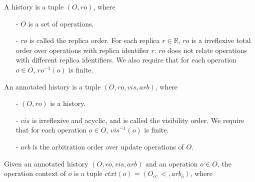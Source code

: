 
A history is a tuple $(O,\mathit{ro})$, where

\begin{itemize}
\setlength{\itemsep}{0.5pt}
\item[-] $O$ is a set of operations.

\item[-] $\mathit{ro}$ is called the replica order. For each replica $r \in \mathbb{R}$, $\mathit{ro}$ is a irreflexive total order over operations with replica identifier $r$. $\mathit{ro}$ does not relate operations with different replica identifiers. We also require that for each operation $o \in O$, $\mathit{ro}^{-1}(o)$ is finite.
\end{itemize}

An annotated history is a tuple $(O,\mathit{ro},\mathit{vis},\mathit{arb})$, where

\begin{itemize}
\setlength{\itemsep}{0.5pt}
\item[-] $(O,\mathit{ro})$ is a history.

\item[-] $\mathit{vis}$ is irreflexive and acyclic, and is called the visibility order. We require that for each operation $o \in O$, $\mathit{vis}^{-1}(o)$ is finite.

\item[-] $\mathit{arb}$ is the arbitration order over update operations of $O$.
\end{itemize}


Given an annotated history $(O,\mathit{ro},\mathit{vis},\mathit{arb})$ and an operation $o \in O$, the operation context of $o$ is a tuple $ctxt(o)=(O_o,<,arb_o)$, where

